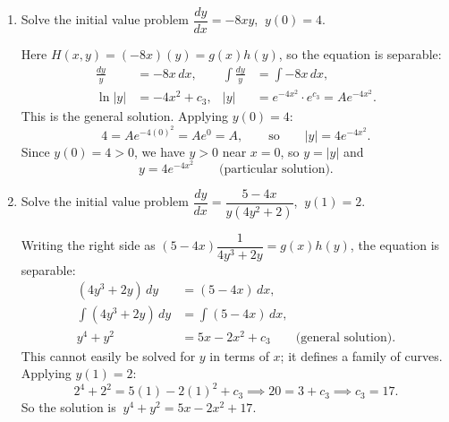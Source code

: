 \documentclass[10pt]{article}
\begin{document}
\begin{enumerate}[leftmargin=*, label=\numbox{\arabic*}]

\item
    \begin{problem}[\vspace{5cm}]
        Solve the initial value problem \(\dfrac{dy}{dx} = -8xy\), \(\ y(0) = 4\).
    \end{problem}
    \begin{solution}
        Here \(H(x,y) = (-8x)(y) = g(x)h(y)\), so the equation is separable:
        \[
        \begin{aligned}
            \frac{dy}{y} &= -8x\,dx, &
            \int \frac{dy}{y} &= \int -8x\,dx, \\
            \ln|y| &= -4x^2 + c_3, &
            |y| &= e^{-4x^2}\cdot e^{c_3} = A e^{-4x^2}.
        \end{aligned}
        \]
        This is the general solution. Applying \(y(0) = 4\):
        \[
            4 = A e^{-4(0)^2} = A e^0 = A,
            \qquad\text{so}\qquad |y| = 4 e^{-4x^2}.
        \]
        Since \(y(0) = 4 > 0\), we have \(y > 0\) near \(x = 0\), so \(y = |y|\) and
        \[
            y = 4 e^{-4x^2} \qquad\text{(particular solution).}
        \]
    \end{solution}

\item
    \begin{problem}[\vspace{6cm}]
        Solve the initial value problem \(\dfrac{dy}{dx} = \dfrac{5 - 4x}{y(4y^2 + 2)}\), \(\ y(1) = 2\).
    \end{problem}
    \begin{solution}
        Writing the right side as \((5 - 4x)\dfrac{1}{4y^3 + 2y} = g(x)h(y)\), the equation is separable:
        \[
        \begin{aligned}
            (4y^3 + 2y)\,dy &= (5 - 4x)\,dx, \\
            \int (4y^3 + 2y)\,dy &= \int (5 - 4x)\,dx, \\
            y^4 + y^2 &= 5x - 2x^2 + c_3 \qquad\text{(general solution).}
        \end{aligned}
        \]
        This cannot easily be solved for \(y\) in terms of \(x\); it defines a family of curves.
        Applying \(y(1) = 2\):
        \[
            2^4 + 2^2 = 5(1) - 2(1)^2 + c_3
            \implies 20 = 3 + c_3 \implies c_3 = 17.
        \]
        So the solution is \(\ y^4 + y^2 = 5x - 2x^2 + 17\).
    \end{solution}


\end{enumerate}
\end{document}
